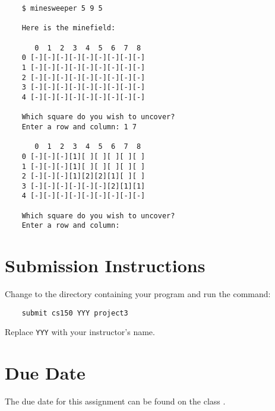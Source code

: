 \documentclass{article}
\begin{document}
\begin{verbatim}
    $ minesweeper 5 9 5

    Here is the minefield:

       0  1  2  3  4  5  6  7  8
    0 [-][-][-][-][-][-][-][-][-]
    1 [-][-][-][-][-][-][-][-][-]
    2 [-][-][-][-][-][-][-][-][-]
    3 [-][-][-][-][-][-][-][-][-]
    4 [-][-][-][-][-][-][-][-][-]

    Which square do you wish to uncover?
    Enter a row and column: 1 7

       0  1  2  3  4  5  6  7  8
    0 [-][-][-][1][ ][ ][ ][ ][ ]
    1 [-][-][-][1][ ][ ][ ][ ][ ]
    2 [-][-][-][1][2][2][1][ ][ ]
    3 [-][-][-][-][-][-][2][1][1]
    4 [-][-][-][-][-][-][-][-][-]

    Which square do you wish to uncover?
    Enter a row and column:
\end{verbatim}

\section*{Submission Instructions}

Change to the directory containing your program
and run the command:

\begin{verbatim}
    submit cs150 YYY project3
\end{verbatim}

Replace \verb!YYY! with your instructor's name.

\section*{Due Date}

The due date for this assignment can be found on the class
.
\end{document}
